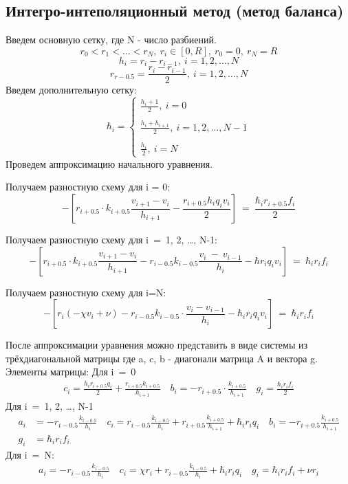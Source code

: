 \subsection{Интегро-интеполяционный метод (метод баланса)}

Введем основную сетку, где N - число разбиений.
\[r_0 < r_1 < \dots < r_N,\ r_i \in [0, R],\ r_0 = 0,\ r_N = R\]
\[
  h_i =r_i - r_{i-1},\ i=1,2, \dots, N
\]
\[
  r_{r-0.5} = \frac{r_i - r_{i-1}}{2},\ i=1,2, \dots, N
\]
Введем дополнительную сетку:
\[
  \hbar_i = \begin{cases}
    \frac{h_i + 1}{2},\ i = 0 \\ \\
    \frac{h_i + h_{i+1}}{2},\ i = 1, 2, \dots, N-1 \\ \\
    \frac{h_i}{2},\ i = N
  \end{cases}
\]
Проведем аппроксимацию начального уравнения.

Получаем разностную схему для i = 0:
\[
  -\left[ r_{i+0.5} \cdot k_{i+0.5}\frac{v_{i+1}-v_i}{h_{i+1}} - \frac{r_{i+0.5} h_i q_i v_i}{2} \right]\ =\ \frac{\hbar_i r_{i+0.5} f_i}{2}
\]

Получаем разностную схему для i\ =\ 1, 2, \dots, N-1:
\[
  -\left[ r_{i+0.5} \cdot k_{i+0.5}\frac{v_{i+1}-v_i}{h_{i+1}} - r_{i-0.5}k_{i-0.5}\frac{v_{i}\ -\ v_{i-1}}{h_{i}} - \hbar r_i q_i v_i\right]\ =\ \hbar_ir_if_i
\]

Получаем разностную схему для i=N:
\[
  -\left[ r_i (-\chi v_i + \nu) - r_{i-0.5}k_{i-0.5} \cdot \frac{v_i-v_{i-1}}{h_i}- \hbar_ir_iq_iv_i \right]\ =\ \hbar_ir_if_i
\]

После аппроксимации уравнения можно представить в виде системы из трёхдиагональной матрицы где a, c, b - диагонали матрица A и вектора g. Элементы матрицы:\newline
Для i\ =\ 0
\begin{align*}
  c_i = \frac{h_i r_{i+0.5} q_i}{2} + \frac{r_{i+0.5} k_{i+0.5}}{h_{i+1}} \quad
  b_i = -r_{i+0.5} \cdot \frac{k_{i+0.5}}{h_{i+1}} \quad
  g_i = \frac{\hbar_i r_i f_i}{2}
\end{align*}
Для i\ =\ 1, 2, \dots, N-1
\begin{align*}
  a_i &= -r_{i-0.5}\frac{k_{i-0.5}}{h_i} \quad
  c_i = r_{i-0.5}\frac{k_{i-0.5}}{h_i} + r_{i+0.5}\frac{k_{i+0.5}}{h_{i+1}} + \hbar_i r_iq_i \quad
  b_i = -r_{i+0.5}\frac{k_{i+0.5}}{h_{i+1}} \\
  g_i &= \hbar_i r_i f_i
\end{align*}
Для i\ =\ N:
\begin{align*}
  a_i = -r_{i-0.5}\frac{k_{i-0.5}}{h_i} \quad
  c_i = \chi r_i + r_{i-0.5}\frac{k_{i-0.5}}{h_i} + \hbar_i r_iq_i \quad
  g_i = \hbar_i r_i f_i + \nu r_i
\end{align*}
